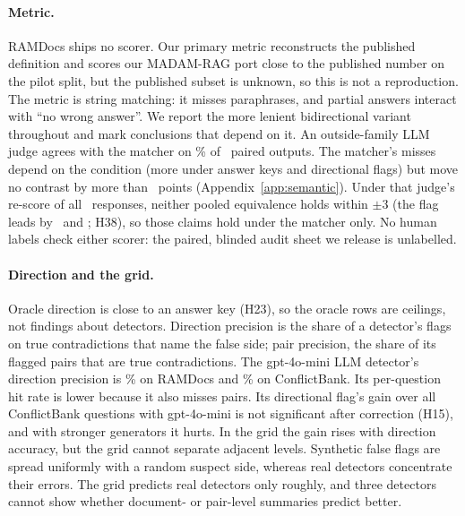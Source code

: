 \paragraph{Metric.} RAMDocs ships no scorer. Our primary metric reconstructs the published definition and scores our
MADAM-RAG port close to the published number on the pilot split, but the published subset is unknown, so this
is not a reproduction. The metric is string matching: it misses paraphrases, and partial answers interact with ``no wrong
answer''. We report the more lenient bidirectional variant throughout and mark conclusions that depend on
it. An outside-family LLM judge agrees with the matcher on \semAgree\% of \semN\ paired outputs. The matcher's
misses depend on the condition (more under answer keys and directional flags) but move no contrast by more than
\semDidMax\ points (Appendix~\ref{app:semantic}). Under that judge's re-score of all \jdN\ responses, neither pooled equivalence holds within
$\pm$3 (the flag leads by \jdThirtyJ\ and \jdTwentyThreeJ; H38), so those claims hold under the matcher only.
No human labels check either scorer: the paired, blinded audit sheet we release is unlabelled.

\paragraph{Direction and the grid.} Oracle direction is close to an answer key (H23), so the
oracle rows are ceilings, not findings about detectors. Direction precision is the share of a detector's flags on true
contradictions that name the false side; pair precision, the share of its flagged pairs that are
true contradictions. The gpt-4o-mini LLM detector's direction precision is
\dirAccLlm\% on RAMDocs and \cbDirAccLlm\% on ConflictBank. Its per-question hit rate is lower because it also misses pairs. Its directional flag's gain over
all ConflictBank questions with gpt-4o-mini is not significant after correction (H15), and with stronger generators it
hurts. In the grid the gain rises with direction accuracy, but the grid cannot separate adjacent levels.
Synthetic false flags are spread uniformly with a random suspect side, whereas real detectors concentrate their
errors. The grid predicts real detectors only roughly, and three detectors cannot show whether document- or pair-level
summaries predict better.

